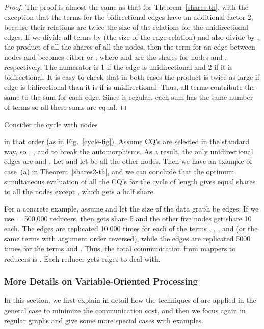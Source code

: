 \begin{proof}
The proof is almost the same as that for Theorem~\ref{shares-th}, with the exception that the terms for the bidirectional edges have an additional factor 2, because their relations are twice the size of the relations for the unidirectional edges.  If we divide all terms by  (the size of the edge relation) and also divide by , the product of all the shares of all the nodes, then the term for an edge between nodes  and  becomes either  or , where  and  are the shares for nodes  and , respectively.  The numerator is 1 if the edge is unidirectional and 2 if it is bidirectional.  It is easy to check that in both cases the product  is twice as large if edge  is bidirectional than it is if  is unidirectional.
Thus, all terms contribute the same to the sum for each edge.
Since  is regular, each sum has the same number of terms so all these sums are equal.
\end{proof}

\begin{example}
\label{shares2-ex}
Consider the cycle  with nodes

in that order (as in Fig.~\ref{cycle-fig}).
Assume CQ's are selected in the standard way, so , , and  to break the automorphisms.  As a result, the only unidirectional edges are  and .  Let  and let  be all the other nodes.
Then we have an example of case~(a) in Theorem~\ref{shares2-th}, and we can conclude that the optimum simultaneous evaluation of all the CQ's for the cycle of length  gives equal shares to all the nodes except , which gets a half share.

For a concrete example, assume  and let the size of the data graph be  edges. If we use  = 500,000 reducers, then  gets share 5 and the other five nodes get share 10 each.  The edges are replicated 10,000 times for each of the terms , , , and  (or the same terms with argument order reversed), while the edges are replicated 5000 times for the terms  and .  Thus, the total communication from mappers to reducers is .
Each reducer gets  edges to deal with.
\end{example}


\subsubsection{More Details on Variable-Oriented Processing}
\label{examples-combine-subsec}

In this section, we first explain in detail how the techniques of \cite{AU10} are
applied in the general case to minimize the communication cost, and then
we focus again in regular graphs and give some more special cases with examples.

